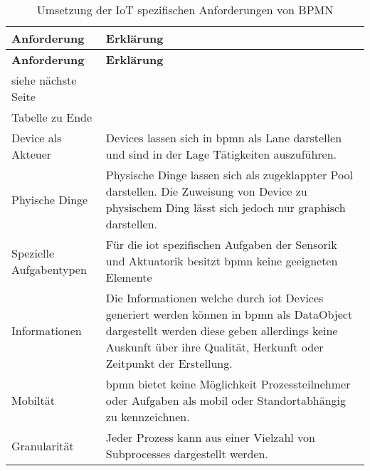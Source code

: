  \begin{longtable}{p{4.5cm}X}
  \caption{Umsetzung der IoT spezifischen Anforderungen von BPMN}\\
  \label{table:evaluierungskriterien}
  \textbf{Anforderung} & \textbf{Erklärung}   \\
  \hline
  \endfirsthead %
  \textbf{Anforderung} & \textbf{Erklärung}  \\
  \hline
  \endhead %
  siehe n{\"a}chste Seite\\
  \endfoot
  \hline
  Tabelle zu Ende \\
  \endlastfoot
  Device als Akteuer & Devices lassen sich in \ac{bpmn} als Lane darstellen und sind in der Lage Tätigkeiten auszuführen.
  \\ \hline
  Phyische Dinge  & Physische Dinge lassen sich als zugeklappter Pool darstellen. Die Zuweisung von Device zu physischem Ding lässt sich jedoch nur graphisch darstellen.
  \\ \hline
  Spezielle Aufgabentypen & Für die \ac{iot} spezifischen Aufgaben der Sensorik und Aktuatorik besitzt \ac{bpmn} keine geeigneten Elemente
  \\ \hline
  Informationen  & Die Informationen welche durch \ac{iot} Devices generiert werden können in \ac{bpmn} als DataObject dargestellt werden diese geben allerdings keine Auskunft über ihre Qualität, Herkunft oder Zeitpunkt der Erstellung.
  \\ \hline
  Mobiltät & \ac{bpmn} bietet keine Möglichkeit Prozessteilnehmer oder Aufgaben als mobil oder Standortabhängig zu kennzeichnen.
  \\ \hline
  Granularität & Jeder Prozess kann aus einer Vielzahl von Subprocesses dargestellt werden.
  \\ \hline
 \end{longtable}
